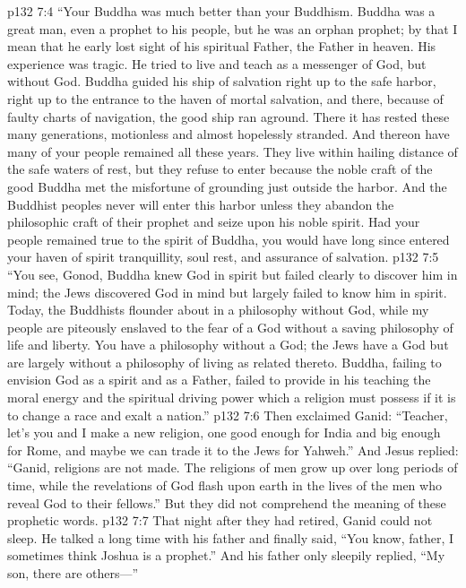 \vs p132 7:4 \textcolor{ubdarkred}{“Your Buddha was much better than your Buddhism. Buddha was a great man, even a prophet to his people, but he was an orphan prophet; by that I mean that he early lost sight of his spiritual Father, the Father in heaven. His experience was tragic. He tried to live and teach as a messenger of God, but without God. Buddha guided his ship of salvation right up to the safe harbor, right up to the entrance to the haven of mortal salvation, and there, because of faulty charts of navigation, the good ship ran aground. There it has rested these many generations, motionless and almost hopelessly stranded. And thereon have many of your people remained all these years. They live within hailing distance of the safe waters of rest, but they refuse to enter because the noble craft of the good Buddha met the misfortune of grounding just outside the harbor. And the Buddhist peoples never will enter this harbor unless they abandon the philosophic craft of their prophet and seize upon his noble spirit. Had your people remained true to the spirit of Buddha, you would have long since entered your haven of spirit tranquillity, soul rest, and assurance of salvation.}
\vs p132 7:5 \textcolor{ubdarkred}{“You see, Gonod, Buddha knew God in spirit but failed clearly to discover him in mind; the Jews discovered God in mind but largely failed to know him in spirit. Today, the Buddhists flounder about in a philosophy without God, while my people are piteously enslaved to the fear of a God without a saving philosophy of life and liberty. You have a philosophy without a God; the Jews have a God but are largely without a philosophy of living as related thereto. Buddha, failing to envision God as a spirit and as a Father, failed to provide in his teaching the moral energy and the spiritual driving power which a religion must possess if it is to change a race and exalt a nation.”}
\vs p132 7:6 Then exclaimed Ganid: “Teacher, let’s you and I make a new religion, one good enough for India and big enough for Rome, and maybe we can trade it to the Jews for Yahweh.” And Jesus replied: \textcolor{ubdarkred}{“Ganid, religions are not made. The religions of men grow up over long periods of time, while the revelations of God flash upon earth in the lives of the men who reveal God to their fellows.”} But they did not comprehend the meaning of these prophetic words.
\pc \vs p132 7:7 That night after they had retired, Ganid could not sleep. He talked a long time with his father and finally said, “You know, father, I sometimes think Joshua is a prophet.” And his father only sleepily replied, “My son, there are others---”
